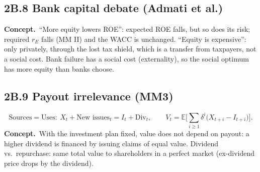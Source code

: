 \documentclass[10pt,a4paper]{article}
\newcommand{\blk}[1]{\subsection*{\color{blue!55!black}#1}}
\newcommand{\idea}{\textbf{Concept.}~}
\newcommand{\E}{\mathbb{E}}
\begin{document}
\blk{2B.8 Bank capital debate (Admati et al.)}
\idea ``More equity lowers ROE'': expected ROE falls, but so does its risk; required $r_E$ falls (MM II)
and the WACC is unchanged. ``Equity is expensive'': only privately, through the lost tax shield, which
is a transfer from taxpayers, not a social cost. Bank failure has a social cost (externality), so
the social optimum has more equity than banks choose.

\blk{2B.9 Payout irrelevance (MM3)}
\[
\text{Sources}=\text{Uses}:\ X_t+\text{New issues}_t=I_t+\text{Div}_t,\qquad
V_t=\E\Big[\sum_{i\ge1}\delta^{i}\big(X_{t+i}-I_{t+i}\big)\Big].
\]
\idea With the investment plan fixed, value does not depend on payout: a higher dividend is financed
by issuing claims of equal value. Dividend vs.\ repurchase: same total value to shareholders in a
perfect market (ex-dividend price drops by the dividend).

\end{document}
